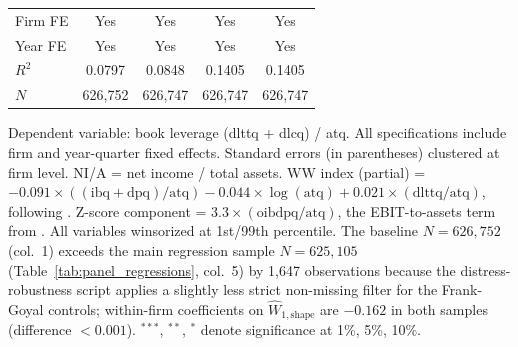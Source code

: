 \begin{table}[htbp]
{\begin{threeparttable}
\begin{tabular}{lcccc}
\midrule
Firm FE & Yes & Yes & Yes & Yes \\
Year FE & Yes & Yes & Yes & Yes \\
$R^2$ & 0.0797 & 0.0848 & 0.1405 & 0.1405 \\
$N$ & 626,752 & 626,747 & 626,747 & 626,747 \\
\bottomrule
\end{tabular}
\begin{tablenotes}[flushleft]
\small
\item Dependent variable: book leverage (dlttq + dlcq) / atq. All specifications include firm and year-quarter fixed effects. Standard errors (in parentheses) clustered at firm level. NI/A = net income / total assets. WW index (partial) = $-0.091 \times ((\text{ibq}+\text{dpq})/\text{atq}) - 0.044 \times \log(\text{atq}) + 0.021 \times (\text{dlttq}/\text{atq})$, following \citet{WhitedWu2006financial}. Z-score component = $3.3 \times (\text{oibdpq}/\text{atq})$, the EBIT-to-assets term from \citet{Altman1968}. All variables winsorized at 1st/99th percentile. The baseline $N = 626{,}752$ (col.\ 1) exceeds the main regression sample $N = 625{,}105$ (Table~\ref{tab:panel_regressions}, col.\ 5) by 1,647 observations because the distress-robustness script applies a slightly less strict non-missing filter for the Frank-Goyal controls; within-firm coefficients on $\widehat{W}_{1,\text{shape}}$ are $-0.162$ in both samples (difference $< 0.001$). $^{***}$, $^{**}$, $^{*}$ denote significance at 1\%, 5\%, 10\%.
\end{tablenotes}
\end{threeparttable}
}
\end{table}